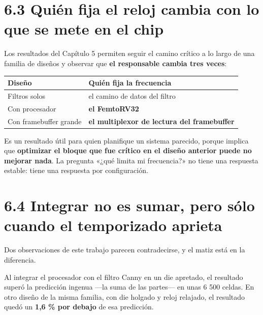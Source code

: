 \section{6.3 Quién fija el reloj cambia con lo que se mete en el
chip}\label{quiuxe9n-fija-el-reloj-cambia-con-lo-que-se-mete-en-el-chip}

Los resultados del Capítulo 5 permiten seguir el camino crítico a lo
largo de una familia de diseños y observar que \textbf{el responsable
cambia tres veces}:

\begin{longtable}[]{@{}
  >{\raggedright\arraybackslash}p{}
  >{\raggedright\arraybackslash}p{}@{}}
\toprule\noalign{}
\begin{minipage}[b]{\linewidth}\raggedright
Diseño
\end{minipage} & \begin{minipage}[b]{\linewidth}\raggedright
Quién fija la frecuencia
\end{minipage} \\
\midrule\noalign{}
\endhead
\bottomrule\noalign{}
\endlastfoot
Filtros solos & el camino de datos del filtro \\
Con procesador & \textbf{el FemtoRV32} \\
Con framebuffer grande & \textbf{el multiplexor de lectura del
framebuffer} \\
\end{longtable}

Es un resultado útil para quien planifique un sistema parecido, porque
implica que \textbf{optimizar el bloque que fue crítico en el diseño
anterior puede no mejorar nada}. La pregunta «¿qué limita mi
frecuencia?» no tiene una respuesta estable: tiene una respuesta por
configuración.

\section{6.4 Integrar no es sumar, pero sólo cuando el temporizado
aprieta}\label{integrar-no-es-sumar-pero-suxf3lo-cuando-el-temporizado-aprieta}

Dos observaciones de este trabajo parecen contradecirse, y el matiz está
en la diferencia.

Al integrar el procesador con el filtro Canny en un die apretado, el
resultado superó la predicción ingenua ---la suma de las partes--- en
unas 6 500 celdas. En otro diseño de la misma familia, con die holgado y
reloj relajado, el resultado quedó un \textbf{1,6 \% por debajo} de esa
predicción.

